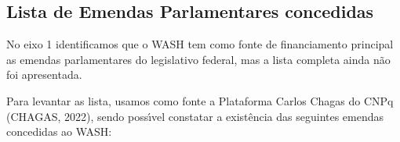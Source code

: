 \documentclass[
12pt,		%
openright,	%
twoside,  %
a4paper,			%
chapter=TITLE,		%
english,			%
french,				%
spanish,			%
brazil				%
]{USPSC-classe/USPSC}
\begin{document}
\subsection[Lista de Emendas Parlamentares concedidas]{Lista de Emendas Parlamentares concedidas}\label{Lista de Emendas Parlamentares concedidas}
No eixo 1 identificamos que o WASH tem como fonte de financiamento principal as emendas parlamentares do legislativo federal, mas a lista completa ainda n\~ao foi apresentada.










Para levantar as lista, usamos como fonte a Plataforma Carlos Chagas do CNPq (CHAGAS, 2022), sendo poss\'{\i}vel constatar a exist\^encia das seguintes emendas concedidas ao WASH:
\end{document}
